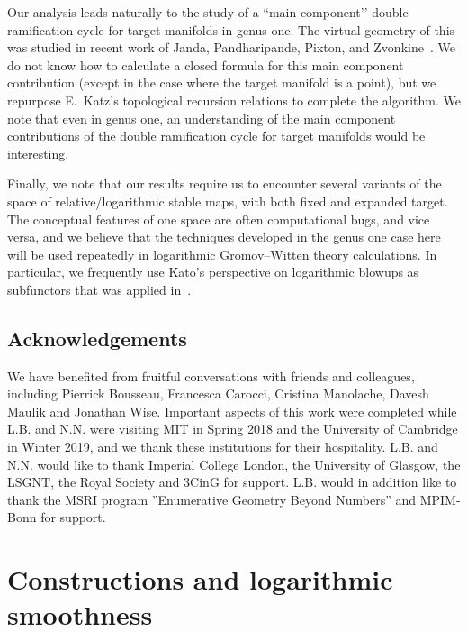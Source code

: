 \documentclass[11pt]{amsart}
\theoremstyle{definition}
\theoremstyle{definition}
\begin{document}
Our analysis leads naturally to the study of a ``main component’’ double ramification cycle for target manifolds in genus one. The virtual geometry of this was studied in recent work of Janda, Pandharipande, Pixton, and Zvonkine~\cite{DRCBundle}. We do not know how to calculate a closed formula for this main component contribution (except in the case where the target manifold is a point), but we repurpose E.~Katz's topological recursion relations \cite{EKatz} to complete the algorithm. We note that even in genus one, an understanding of the main component contributions of the double ramification cycle for target manifolds would be interesting.

Finally, we note that our results require us to encounter several variants of the space of relative/logarithmic stable maps, with both fixed and expanded target. The conceptual features of one space are often computational bugs, and vice versa, and we believe that the techniques developed in the genus one case here will be used repeatedly in logarithmic Gromov--Witten theory calculations. In particular, we frequently use Kato's perspective on logarithmic blowups as subfunctors \cite{KatoExactness} that was applied in~\cite{RSPW,RSPW2}.

\subsection*{Acknowledgements} We have benefited from fruitful conversations with friends and colleagues, including Pierrick Bousseau, Francesca Carocci, Cristina Manolache, Davesh Maulik and Jonathan Wise. Important aspects of this work were completed while L.B. and N.N. were visiting MIT in Spring 2018 and the University of Cambridge in Winter 2019, and we thank these institutions for their hospitality. L.B. and N.N. would like to thank Imperial College London, the University of Glasgow, the LSGNT, the Royal Society and 3CinG for support. L.B. would in addition like to thank the MSRI program ''Enumerative Geometry Beyond Numbers'' and MPIM-Bonn for support.


\newpage


\section{Constructions and logarithmic smoothness}\label{section construction}
\end{document}

